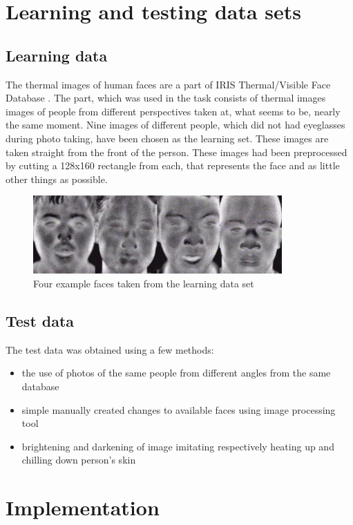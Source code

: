 \documentclass[pdftex]{article}
\begin{document}
\section{Learning and testing data sets}
\subsection{Learning data}
The thermal images of human faces are a part of  IRIS Thermal/Visible Face Database \cite{dataset}. The part, which was used in the task consists of thermal images images of people from different perspectives taken at, what seems to be, nearly the same moment. Nine images of different people, which did not had eyeglasses during photo taking, have been chosen as the learning set. These images are taken straight from the front of the person. These images had been preprocessed by cutting a 128x160 rectangle from each, that represents the face and as little other things as possible.
\begin{figure}[!htb]
	\centering
	\includegraphics[width=0.85\textwidth]{pictures/faces.png} 
	\caption{Four example faces taken from the learning data set}
\end{figure}

\subsection{Test data}
The test data was obtained using a few methods:
\begin{itemize}
\item{the use of photos of the same people from different angles from the same database}
\item{simple manually created changes to available faces using image processing tool}
\item{brightening and darkening of image imitating respectively heating up and chilling down person's skin}
\end{itemize}

\clearpage
\section{Implementation}
\end{document}
